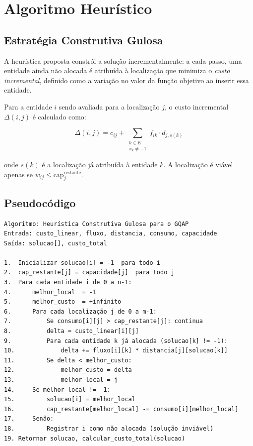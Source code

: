 \documentclass[12pt]{article}
\begin{document}
\section{Algoritmo Heurístico}

\subsection{Estratégia Construtiva Gulosa}

A heurística proposta constrói a solução incrementalmente: a cada passo, uma
entidade ainda não alocada é atribuída à localização que minimiza o
\textit{custo incremental}, definido como a variação no valor da função objetivo
ao inserir essa entidade.

Para a entidade $i$ sendo avaliada para a localização $j$, o custo incremental
$\Delta(i, j)$ é calculado como:

\begin{equation}
\Delta(i, j) = c_{ij} + \sum_{\substack{k \in E \\ x_k \neq -1}} f_{ik} \cdot d_{j, s(k)}
\label{eq:delta}
\end{equation}

onde $s(k)$ é a localização já atribuída à entidade $k$. A localização é
viável apenas se $w_{ij} \leq \text{cap}_j^{\text{restante}}$.

\subsection{Pseudocódigo}

\begin{verbatim}
Algoritmo: Heurística Construtiva Gulosa para o GQAP
Entrada: custo_linear, fluxo, distancia, consumo, capacidade
Saída: solucao[], custo_total

1.  Inicializar solucao[i] = -1  para todo i
2.  cap_restante[j] = capacidade[j]  para todo j
3.  Para cada entidade i de 0 a n-1:
4.      melhor_local  = -1
5.      melhor_custo  = +infinito
6.      Para cada localização j de 0 a m-1:
7.          Se consumo[i][j] > cap_restante[j]: continua
8.          delta = custo_linear[i][j]
9.          Para cada entidade k já alocada (solucao[k] != -1):
10.             delta += fluxo[i][k] * distancia[j][solucao[k]]
11.         Se delta < melhor_custo:
12.             melhor_custo = delta
13.             melhor_local = j
14.     Se melhor_local != -1:
15.         solucao[i] = melhor_local
16.         cap_restante[melhor_local] -= consumo[i][melhor_local]
17.     Senão:
18.         Registrar i como não alocada (solução inviável)
19. Retornar solucao, calcular_custo_total(solucao)
\end{verbatim}
\end{document}
